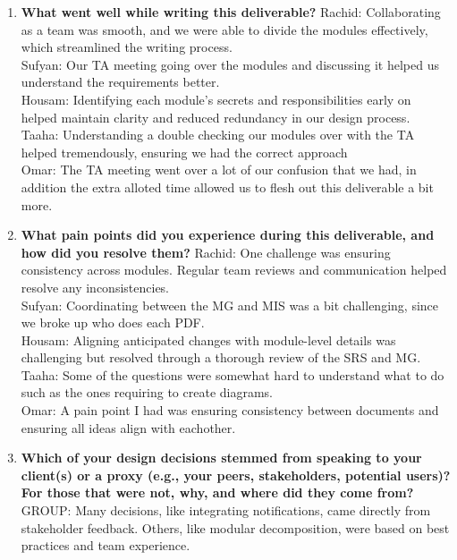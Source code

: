 \documentclass[12pt, titlepage]{article}
\begin{document}
\begin{enumerate}
    \item \textbf{What went well while writing this deliverable?}  
    \newline
    Rachid: Collaborating as a team was smooth, and we were able to divide the modules effectively, which streamlined the writing process. \\
    Sufyan: Our TA meeting going over the modules and discussing it helped us understand the requirements better. \\
    Housam: Identifying each module’s secrets and responsibilities early on helped maintain clarity and reduced redundancy in our design process. \\
    Taaha: Understanding a double checking our modules over with the TA helped tremendously, ensuring we had the correct approach \\
    Omar: The TA meeting went over a lot of our confusion that we had, in addition the extra alloted time allowed us to flesh out this deliverable a bit more. \\
  
    \item \textbf{What pain points did you experience during this deliverable, and how did you resolve them?}  
    \newline
    Rachid: One challenge was ensuring consistency across modules. Regular team reviews and communication helped resolve any inconsistencies. \\
    Sufyan: Coordinating between the MG and MIS was a bit challenging, since we broke up who does each PDF. \\
    Housam: Aligning anticipated changes with module-level details was challenging but resolved through a thorough review of the SRS and MG. \\
    Taaha: Some of the questions were somewhat hard to understand what to do such as the ones requiring to create diagrams. \\
    Omar: A pain point I had was ensuring consistency between documents and ensuring all ideas align with eachother. \\
  
    \item \textbf{Which of your design decisions stemmed from speaking to your client(s) or a proxy (e.g., your peers, stakeholders, potential users)? For those that were not, why, and where did they come from?}  
    \newline
    GROUP: Many decisions, like integrating notifications, came directly from stakeholder feedback. Others, like modular decomposition, were based on best practices and team experience.
  

\end{enumerate}
\end{document}
